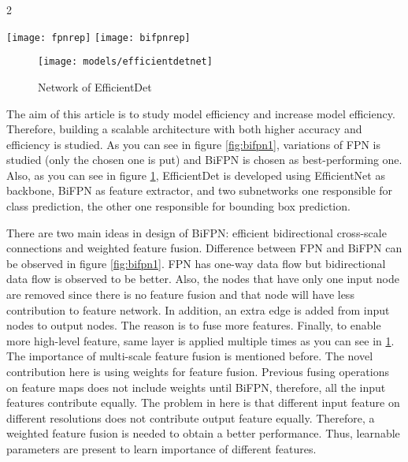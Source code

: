 \documentclass{article}
\begin{document}
\setlength{\parindent}{6ex}


\begin{multicols}{2}
    \begin{figure*}[ht!]
        \texttt{[image: fpnrep]}\hfill
        \texttt{[image: bifpnrep]}
        \caption{FPN (left) and BiFPN (right)}
        \label{fig:bifpn1}
    \end{figure*}
\end{multicols}

\begin{figure}
    \centering
    \texttt{[image: models/efficientdetnet]}
    \caption{Network of EfficientDet}
    \label{fig:efficientdetnet1}
\end{figure}

\indent

The aim of this article is to study model efficiency and increase model 
efficiency. Therefore, building a scalable architecture with both higher 
accuracy and efficiency is studied. As you can see in figure 
\ref{fig:bifpn1}, variations of FPN is studied (only the chosen one is 
put) and BiFPN is chosen as best-performing one. Also, as you can see 
in figure \ref{fig:efficientdetnet1}, EfficientDet is developed using 
EfficientNet as backbone, BiFPN as feature extractor, and two subnetworks 
one responsible for class prediction, the other one responsible for bounding 
box prediction. \par

There are two main ideas in design of BiFPN: efficient bidirectional 
cross-scale connections and weighted feature fusion. Difference between 
FPN and BiFPN can be observed in figure \ref{fig:bifpn1}. FPN has one-way 
data flow but bidirectional data flow is observed to be better. Also, 
the nodes that have only one input node are removed since there is no 
feature fusion and that node will have less contribution to feature network. 
In addition, an extra edge is added from input nodes to output nodes. The 
reason is to fuse more features. Finally, to enable more high-level feature, 
same layer is applied multiple times as you can see in \ref{fig:efficientdetnet1}.
The importance of multi-scale feature fusion is mentioned before. The novel contribution 
here is using weights for feature fusion. Previous fusing operations 
on feature maps does not include weights until BiFPN, therefore, all the 
input features contribute equally. The problem in here is that different 
input feature on different resolutions does not contribute output feature 
equally. Therefore, a weighted feature fusion is needed to obtain a better 
performance. Thus, learnable parameters are present to learn importance 
of different features. \par
\end{document}

